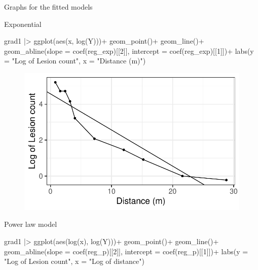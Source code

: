 \documentclass[
  letterpaper,
  DIV=11,
  numbers=noendperiod]{scrreprt}
\newenvironment{Shaded}{\begin{snugshade}}{\end{snugshade}}
\newcommand{\AttributeTok}[1]{\textcolor[rgb]{0.40,0.45,0.13}{#1}}
\newcommand{\DecValTok}[1]{\textcolor[rgb]{0.68,0.00,0.00}{#1}}
\newcommand{\FunctionTok}[1]{\textcolor[rgb]{0.28,0.35,0.67}{#1}}
\newcommand{\NormalTok}[1]{\textcolor[rgb]{0.00,0.23,0.31}{#1}}
\newcommand{\SpecialCharTok}[1]{\textcolor[rgb]{0.37,0.37,0.37}{#1}}
\newcommand{\StringTok}[1]{\textcolor[rgb]{0.13,0.47,0.30}{#1}}
\begin{document}
Graphs for the fitted models

Exponential

\begin{Shaded}
\begin{Highlighting}[]
\NormalTok{grad1 }\SpecialCharTok{|\textgreater{}} 
  \FunctionTok{ggplot}\NormalTok{(}\FunctionTok{aes}\NormalTok{(x, }\FunctionTok{log}\NormalTok{(Y)))}\SpecialCharTok{+}
  \FunctionTok{geom\_point}\NormalTok{()}\SpecialCharTok{+}
  \FunctionTok{geom\_line}\NormalTok{()}\SpecialCharTok{+}
  \FunctionTok{geom\_abline}\NormalTok{(}\AttributeTok{slope =} \FunctionTok{coef}\NormalTok{(reg\_exp)[[}\DecValTok{2}\NormalTok{]], }\AttributeTok{intercept =} \FunctionTok{coef}\NormalTok{(reg\_exp)[[}\DecValTok{1}\NormalTok{]])}\SpecialCharTok{+}
 \FunctionTok{labs}\NormalTok{(}\AttributeTok{y =} \StringTok{"Log of Lesion count"}\NormalTok{,}
       \AttributeTok{x =} \StringTok{"Distance (m)"}\NormalTok{)}
\end{Highlighting}
\end{Shaded}

\begin{figure}[H]

{\centering \includegraphics{./spatial-fitting_files/figure-pdf/unnamed-chunk-14-1.pdf}

}

\end{figure}

Power law model

\begin{Shaded}
\begin{Highlighting}[]
\NormalTok{grad1 }\SpecialCharTok{|\textgreater{}} 
  \FunctionTok{ggplot}\NormalTok{(}\FunctionTok{aes}\NormalTok{(}\FunctionTok{log}\NormalTok{(x), }\FunctionTok{log}\NormalTok{(Y)))}\SpecialCharTok{+}
  \FunctionTok{geom\_point}\NormalTok{()}\SpecialCharTok{+}
  \FunctionTok{geom\_line}\NormalTok{()}\SpecialCharTok{+}
  \FunctionTok{geom\_abline}\NormalTok{(}\AttributeTok{slope =} \FunctionTok{coef}\NormalTok{(reg\_p)[[}\DecValTok{2}\NormalTok{]], }\AttributeTok{intercept =} \FunctionTok{coef}\NormalTok{(reg\_p)[[}\DecValTok{1}\NormalTok{]])}\SpecialCharTok{+}
 \FunctionTok{labs}\NormalTok{(}\AttributeTok{y =} \StringTok{"Log of Lesion count"}\NormalTok{,}
       \AttributeTok{x =} \StringTok{"Log of distance"}\NormalTok{)}
\end{Highlighting}
\end{Shaded}
\end{document}
